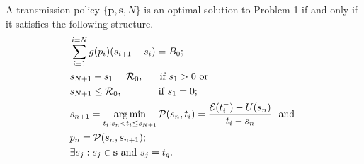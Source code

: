 \begin{theorem}
A transmission policy $\{\textbf{p},\textbf{s},N\}$ is an optimal solution to Problem 1 if and only if it satisfies the following structure.
\label{th_algo1_1}
\begin{align}
&\sum_{i=1}^{i=N}g(p_i)(s_{i+1}-s_i)=B_0; 								
\label{claim1}
\\
&\nonumber s_{N+1}-s_1=\mathcal{R}_0, 	 \ \ \ \ 						\text{ if } s_1>0 \text{ or }
\\
& s_{N+1}\le \mathcal{R}_0,				\ \ \ \ \ \ \ \ \ \				\text{ if } s_1=0;
\label{claim2}
\\
& \nonumber s_{n+1}=\argmin_{t_i: s_n < t_i \le s_{N+1}} \mathcal{P}(s_n,t_i)=\dfrac{\ETx(t_i^-)-U(s_n)}{t_i-s_n} \	\text{ and }
\\
&p_n=\mathcal{P}(s_{n},s_{n+1});\label{claim3}							
\\
&\exists s_j:s_j\in \textbf{s} \text{ and } s_j=t_q.					
\label{claim4}
\end{align}
\end{theorem}
